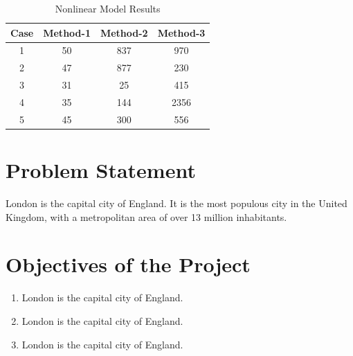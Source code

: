 \begin{table}[ht]
	\caption{Nonlinear Model Results} %
	\centering %
	\begin{tabular}{c c c c} %
		\hline\hline %
		Case & Method-1 & Method-2 & Method-3 \\ [0.5ex] %
		\hline %
		1 & 50 & 837 & 970 \\ %
		2 & 47 & 877 & 230 \\
		3 & 31 & 25 & 415 \\
		4 & 35 & 144 & 2356 \\
		5 & 45 & 300 & 556 \\ [1ex] %
		\hline %
	\end{tabular}
	\label{table:NonLinear} %
\end{table}

\section{Problem Statement}  %
London is the capital city of England. It is the most populous city in the United Kingdom, with a metropolitan area of over 13 million inhabitants.

\section{Objectives of the Project}  %
\begin{enumerate}[label={(\arabic*)}]
	\item London is the capital city of England.
	\item London is the capital city of England.
	\item London is the capital city of England.
\end{enumerate}
\null


